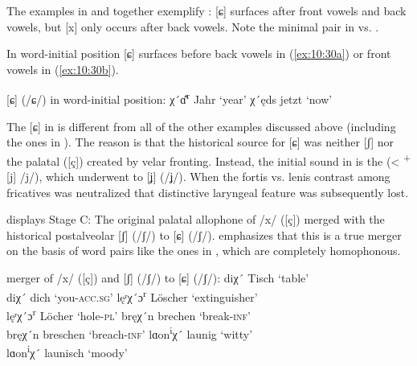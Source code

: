 \begin{xlist}
The examples in  and  together exemplify : [ɕ] surfaces after front vowels and back vowels, but [x] only occurs after back vowels. Note the minimal pair in  vs. .

  In word-initial position [ɕ] surfaces before back vowels in (\ref{ex:10:30a}) or front vowels in (\ref{ex:10:30b}).

\ea%
\label{ex:10:30} [ɕ] (/ɕ/) in word-initial position:
\ea\label{ex:10:30a}  χ´ɑ̊̄\textsuperscript{r} \tab  [ɕɑːɐ]\tab  Jahr \tab  ‘year’
\ex\label{ex:10:30b}   χ´ęds                  \tab [ɕɛts] \tab jetzt \tab ‘now’  
\z 
\z 

The [ɕ] in  is different from all of the other examples discussed above (including the ones in ). The reason is that the historical source for [ɕ] was neither [ʃ] nor the palatal ([ç]) created by velar fronting. Instead, the initial sound in  is the  (<  \textsuperscript{+}[j] /j/), which underwent  to [ʝ] (/ʝ/). When the fortis vs. lenis contrast among fricatives was neutralized that distinctive laryngeal feature was subsequently lost.

 displays Stage C: The original palatal allophone of /x/ ([ç]) merged with the historical postalveolar  [ʃ] (/ʃ/) to [ɕ] (/ʃ/). \citet[183]{Große1957} emphasizes that this is a true merger on the basis of word pairs like the ones in , which are completely homophonous.

\ea
\label{ex:10:31} merger of /x/ ([ç]) and [ʃ] (/ʃ/) to [ɕ] (/ʃ/):
\ea\label{ex:10:31a} diχ´ \tab [diɕ] \tab Tisch \tab ‘table’ \\
    diχ´ \tab [diɕ] \tab dich \tab ‘you\textsc{{}-acc.sg}’ 
\ex\label{ex:10:31b} lęʳχ´ɔ\textsuperscript{r} \tab [lɛɕɔr] \tab  Löscher \tab ‘extinguisher’ \\
    lęʳχ´ɔ\textsuperscript{r} \tab [lɛɕɔr] \tab Löcher \tab ‘hole-\textsc{pl}’ 
\ex\label{ex:10:31c} bręχ´n \tab  [brɛɕn̩] \tab brechen \tab ‘break\textsc{{}-inf}’ \\
    bręχ´n \tab  [brɛɕn̩] \tab breschen \tab ‘breach\textsc{{}-inf}’ 
\ex\label{ex:10:31d} lɑon\textsuperscript{i}χ´ \tab [lɑoniɕ] \tab launig \tab ‘witty’ \\
    lɑon\textsuperscript{i}χ´ \tab [lɑoniɕ] \tab launisch \tab ‘moody’ 
    \z
\z 


\end{xlist}
